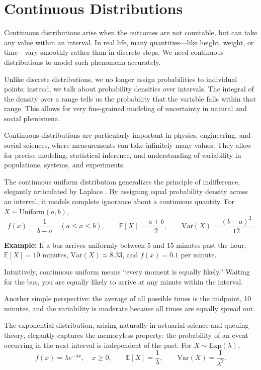 \documentclass{book}
\begin{document}
\section{Continuous Distributions}

Continuous distributions arise when the outcomes are not countable, but can take any value within an interval. In real life, many quantities—like height, weight, or time—vary smoothly rather than in discrete steps. We need continuous distributions to model such phenomena accurately.

Unlike discrete distributions, we no longer assign probabilities to individual points; instead, we talk about probability densities over intervals. The integral of the density over a range tells us the probability that the variable falls within that range. This allows for very fine-grained modeling of uncertainty in natural and social phenomena.

Continuous distributions are particularly important in physics, engineering, and social sciences, where measurements can take infinitely many values. They allow for precise modeling, statistical inference, and understanding of variability in populations, systems, and experiments.

The continuous uniform distribution generalizes the principle of indifference, elegantly articulated by Laplace \cite{laplace-probability}. By assigning equal probability density across an interval, it models complete ignorance about a continuous quantity. For $X \sim \text{Uniform}(a,b)$,
\[
f(x) = \frac{1}{b-a} \quad (a \leq x \leq b), \qquad
\mathbb{E}[X] = \frac{a+b}{2}, \qquad
\mathrm{Var}(X)=\frac{(b-a)^2}{12}.
\]

\textbf{Example:} If a bus arrives uniformly between 5 and 15 minutes past the hour, $\mathbb{E}[X]=10$ minutes, $\mathrm{Var}(X) \approx 8.33$, and $f(x)=0.1$ per minute.

Intuitively, continuous uniform means “every moment is equally likely.” Waiting for the bus, you are equally likely to arrive at any minute within the interval.

Another simple perspective: the average of all possible times is the midpoint, 10 minutes, and the variability is moderate because all times are equally spread out.

The exponential distribution, arising naturally in actuarial science and queuing theory, elegantly captures the memoryless property: the probability of an event occurring in the next interval is independent of the past. For $X \sim \text{Exp}(\lambda)$,
\[
f(x) = \lambda e^{-\lambda x}, \quad x \geq 0, \qquad 
\mathbb{E}[X]=\frac{1}{\lambda}, \qquad
\mathrm{Var}(X)=\frac{1}{\lambda^2}.
\]
\end{document}
